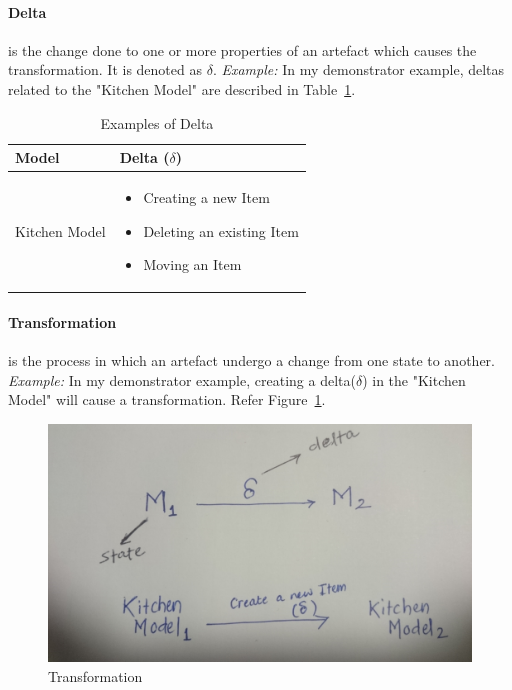 \paragraph{Delta} is the change done to one or more properties of an artefact which causes the transformation. It is denoted as $\delta$.
\newline\newline\textit{Example:} In my demonstrator example, deltas related to the "Kitchen Model" are described in Table~\ref{tab:Examples of Delta}. 
\begin{table}
	\centering	
	\begin{tabular}{|p{5cm}|p{10cm}|}
		\hline
		\rowcolor[gray]{.8}	
		\textbf{Model} & \textbf{Delta ($\delta$)} \\
		\hline
		Kitchen Model & 
		\begin{itemize}
			\item Creating a new Item
			\item Deleting an existing Item
			\item Moving an Item
		\end{itemize}\\
		\hline				
		
	\end{tabular}
	\label{tab:Examples of Delta}
	\caption{Examples of Delta}
\end{table}

\paragraph{Transformation} is the process in which an artefact undergo a change from one state to another. 
\newline\newline\textit{Example:} In my demonstrator example, creating a delta($\delta$) in the "Kitchen Model" will cause a transformation. Refer Figure~\ref{fig:Transformation_Diagram}.

\begin{figure}
	\includegraphics[width=1\textwidth]{figures/Transformation}
	\caption{Transformation}
	\label{fig:Transformation_Diagram}
\end{figure}

